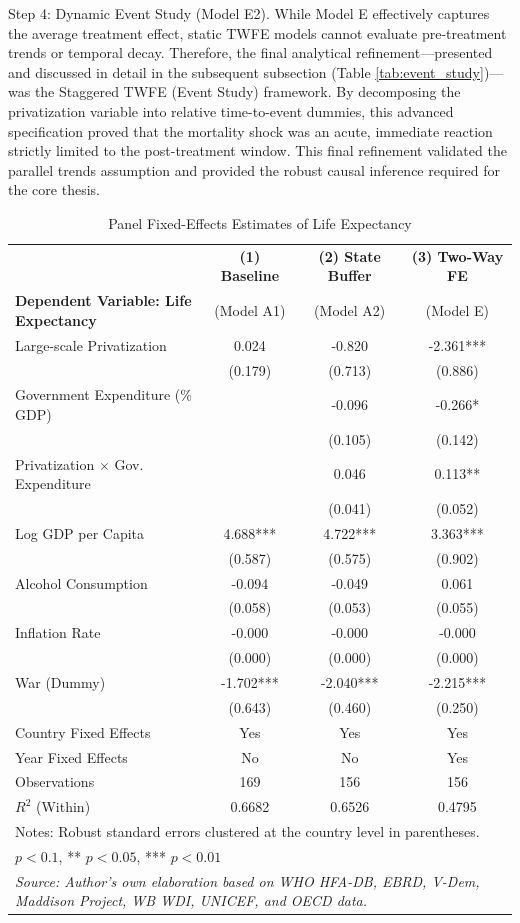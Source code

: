 \documentclass[12pt]{article}
\begin{document}
Step 4: Dynamic Event Study (Model E2). While Model E effectively captures the average treatment effect, static TWFE models cannot evaluate pre-treatment trends or temporal decay. 
Therefore, the final analytical refinement---presented and discussed in detail in the subsequent subsection (Table \ref{tab:event_study})---was the Staggered TWFE (Event Study) 
framework. By decomposing the privatization variable into relative time-to-event dummies, this advanced specification proved that the mortality shock was an acute, immediate reaction 
strictly limited to the post-treatment window. This final refinement validated the parallel trends assumption and provided the robust causal inference required for the core thesis.


\begin{table}[H]
\centering
\caption{Panel Fixed-Effects Estimates of Life Expectancy}
\label{tab:life_expectancy_models}
\footnotesize
\begin{tabular}{l c c c}
\toprule
 & \textbf{(1) Baseline} & \textbf{(2) State Buffer} & \textbf{(3) Two-Way FE} \\
\textbf{Dependent Variable: Life Expectancy} & (Model A1) & (Model A2) & (Model E) \\
\midrule
Large-scale Privatization & 0.024 & -0.820 & -2.361*** \\
 & (0.179) & (0.713) & (0.886) \\
Government Expenditure (\% GDP) & & -0.096 & -0.266* \\
 & & (0.105) & (0.142) \\
Privatization $\times$ Gov. Expenditure & & 0.046 & 0.113** \\
 & & (0.041) & (0.052) \\
Log GDP per Capita & 4.688*** & 4.722*** & 3.363*** \\
 & (0.587) & (0.575) & (0.902) \\
Alcohol Consumption & -0.094 & -0.049 & 0.061 \\
 & (0.058) & (0.053) & (0.055) \\
Inflation Rate & -0.000 & -0.000 & -0.000 \\
 & (0.000) & (0.000) & (0.000) \\
War (Dummy) & -1.702*** & -2.040*** & -2.215*** \\
 & (0.643) & (0.460) & (0.250) \\
\midrule
Country Fixed Effects & Yes & Yes & Yes \\
Year Fixed Effects & No & No & Yes \\
Observations & 169 & 156 & 156 \\
$R^2$ (Within) & 0.6682 & 0.6526 & 0.4795 \\
\bottomrule
\multicolumn{4}{l}{\scriptsize Notes: Robust standard errors clustered at the country level in parentheses.} \\
\multicolumn{4}{l}{\scriptsize * $p < 0.1$, ** $p < 0.05$, *** $p < 0.01$} \\
\multicolumn{4}{l}{\scriptsize \textit{Source: Author's own elaboration based on WHO HFA-DB, EBRD, V-Dem, Maddison Project, WB WDI, UNICEF, and OECD data.}} \\
\end{tabular}
\end{table}
\end{document}
